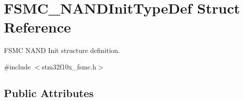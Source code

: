 \hypertarget{struct_f_s_m_c___n_a_n_d_init_type_def}{}\section{F\+S\+M\+C\+\_\+\+N\+A\+N\+D\+Init\+Type\+Def Struct Reference}
\label{struct_f_s_m_c___n_a_n_d_init_type_def}


F\+S\+MC N\+A\+ND Init structure definition.  




{\ttfamily \#include $<$stm32f10x\+\_\+fsmc.\+h$>$}

\subsection*{Public Attributes}
